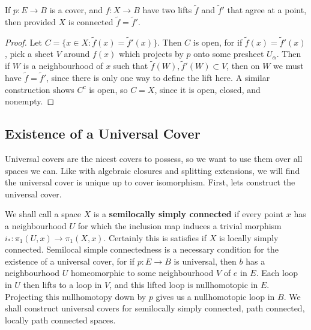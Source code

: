 \begin{lemma}
    If $p: E \to B$ is a cover, and $f: X \to B$ have two lifts $\tilde{f}$ and $\tilde{f}'$ that agree at a point, then provided $X$ is connected $\tilde{f} = \tilde{f}'$.
\end{lemma}
\begin{proof}
    Let $C = \{ x \in X : \tilde{f}(x) = \tilde{f}'(x) \}$. Then $C$ is open, for if $\tilde{f}(x) = \tilde{f}'(x)$, pick a sheet $V$ around $f(x)$ which projects by $p$ onto some presheet $U_\alpha$. Then if $W$ is a neighbourhood of $x$ such that $\tilde{f}(W), \tilde{f}'(W) \subset V$, then on $W$  we must have $\tilde{f} = \tilde{f}'$, since there is only one way to define the lift here. A similar construction shows $C^c$ is open, so $C = X$, since it is open, closed, and nonempty.
\end{proof}


\subsection{Existence of a Universal Cover}

Universal covers are the nicest covers to possess, so we want to use them over all spaces we can. Like with algebraic closures and splitting extensions, we will find the universal cover is unique up to cover isomorphism. First, lets construct the universal cover.

We shall call a space $X$ is a {\bf semilocally simply connected} if every point $x$ has a neighbourhood $U$ for which the inclusion map induces a trivial morphism $i_*: \pi_1(U,x) \to \pi_1(X,x)$. Certainly this is satisfies if $X$ is locally simply connected. Semilocal simple connectedness is a necessary condition for the existence of a universal cover, for if $p: E \to B$ is universal, then $b$ has a neighbourhood $U$ homeomorphic to some neighbourhood $V$ of $e$ in $E$. Each loop in $U$ then lifts to a loop in $V$, and this lifted loop is nullhomotopic in $E$. Projecting this nullhomotopy down by $p$ gives us a nullhomotopic loop in $B$. We shall construct universal covers for semilocally simply connected, path connected, locally path connected spaces.

